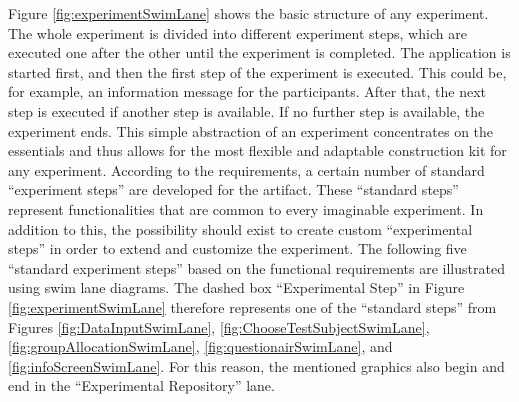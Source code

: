 
Figure \ref{fig:experimentSwimLane} shows the basic structure of any experiment. The whole experiment is divided into different experiment steps, which are executed one after the other until the experiment is completed. The application is started first, and then the first step of the experiment is executed. This could be, for example, an information message for the participants. After that, the next step is executed if another step is available. If no further step is available, the experiment ends. This simple abstraction of an experiment concentrates on the essentials and thus allows for the most flexible and adaptable construction kit for any experiment. According to the requirements, a certain number of standard \enquote{experiment steps} are developed for the artifact. These \enquote{standard steps} represent functionalities that are common to every imaginable experiment. In addition to this, the possibility should exist to create custom \enquote{experimental steps} in order to extend and customize the experiment. The following five \enquote{standard experiment steps} based on the functional requirements are illustrated using swim lane diagrams. The dashed box \enquote{Experimental Step} in Figure \ref{fig:experimentSwimLane} therefore represents one of the \enquote{standard steps} from Figures \ref{fig:DataInputSwimLane}, \ref{fig:ChooseTestSubjectSwimLane}, \ref{fig:groupAllocationSwimLane}, \ref{fig:questionairSwimLane}, and \ref{fig:infoScreenSwimLane}. For this reason, the mentioned graphics also begin and end in the \enquote{Experimental Repository} lane.


